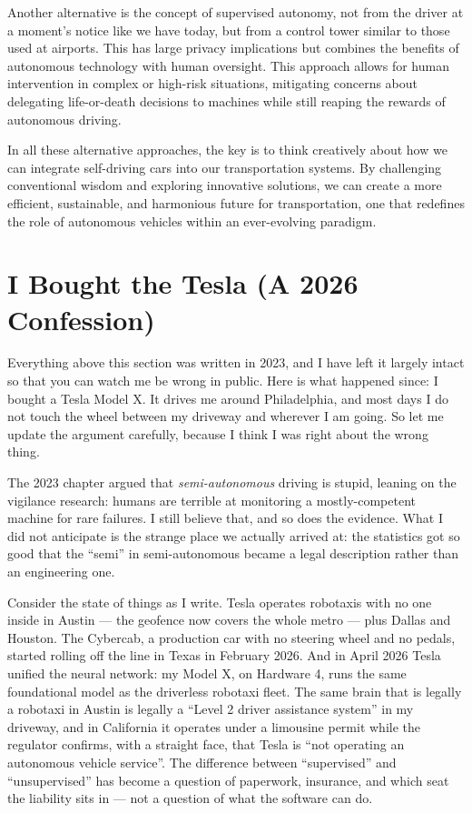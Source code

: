 Another alternative is the concept of supervised autonomy, not from the driver at a moment's notice like we have today, but from a control tower similar to those used at airports. This has large privacy implications but combines the benefits of autonomous technology with human oversight. This approach allows for human intervention in complex or high-risk situations, mitigating concerns about delegating life-or-death decisions to machines while still reaping the rewards of autonomous driving.

In all these alternative approaches, the key is to think creatively about how we can integrate self-driving cars into our transportation systems. By challenging conventional wisdom and exploring innovative solutions, we can create a more efficient, sustainable, and harmonious future for transportation, one that redefines the role of autonomous vehicles within an ever-evolving paradigm.

\section{I Bought the Tesla (A 2026 Confession)}

Everything above this section was written in 2023, and I have left it largely intact so that you can watch me be wrong in public. Here is what happened since: I bought a Tesla Model X. It drives me around Philadelphia, and most days I do not touch the wheel between my driveway and wherever I am going. So let me update the argument carefully, because I think I was right about the wrong thing.

The 2023 chapter argued that \textit{semi-autonomous} driving is stupid, leaning on the vigilance research: humans are terrible at monitoring a mostly-competent machine for rare failures. I still believe that, and so does the evidence. What I did not anticipate is the strange place we actually arrived at: the statistics got so good that the ``semi'' in semi-autonomous became a legal description rather than an engineering one.

Consider the state of things as I write. Tesla operates robotaxis with no one inside in Austin --- the geofence now covers the whole metro --- plus Dallas and Houston. The Cybercab, a production car with no steering wheel and no pedals, started rolling off the line in Texas in February 2026. And in April 2026 Tesla unified the neural network: my Model X, on Hardware 4, runs the same foundational model as the driverless robotaxi fleet. The same brain that is legally a robotaxi in Austin is legally a ``Level 2 driver assistance system'' in my driveway, and in California it operates under a limousine permit while the regulator confirms, with a straight face, that Tesla is ``not operating an autonomous vehicle service''. The difference between ``supervised'' and ``unsupervised'' has become a question of paperwork, insurance, and which seat the liability sits in --- not a question of what the software can do.

